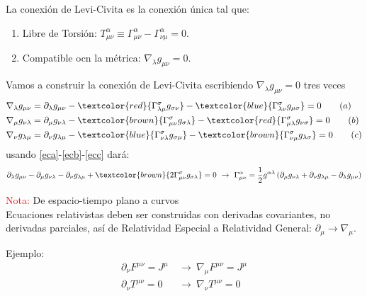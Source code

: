 \documentclass[../main]{subfiles}
\begin{document}
\begin{adjustwidth}{0pt}{-100pt}
 La conexión de Levi-Civita es la conexión única tal que:
\begin{enumerate}
    \item Libre de Torsión: $T^{\alpha}_{\mu\nu}\equiv \Gamma^{\alpha}_{\mu\nu}-\Gamma^{\alpha}_{\nu\mu}=0$.
    \item Compatible ocn la métrica: $\nabla_{\lambda} g_{\mu\nu}=0$.
\end{enumerate}

Vamos a construir la conexión de Levi-Civita escribiendo $\nabla_{\lambda}g_{\mu\nu}=0$ tres veces 
\begin{align}
    \nabla_{\lambda}g_{\mu\nu}&=\partial_{\lambda}g_{\mu\nu}-\textcolor{red}{\Gamma^{\sigma}_{\lambda\mu}g_{\sigma\nu}}-\textcolor{blue}{\Gamma^{\sigma}_{\lambda\nu}g_{\mu\sigma}}=0 \tag{$a$} \label{eca}\\
    \nabla_{\mu}g_{\nu\lambda}&=\partial_{\mu}g_{\nu\lambda}-\textcolor{brown}{\Gamma^{\sigma}_{\mu\nu}g_{\sigma\lambda}}-\textcolor{red}{\Gamma^{\sigma}_{\mu\lambda}g_{\nu\sigma}}=0 \tag{$b$} \label{ecb}\\
    \nabla_{\nu}g_{\lambda\mu}&=\partial_{\nu}g_{\lambda\mu}-\textcolor{blue}{\Gamma^{\sigma}_{\nu\lambda}g_{\sigma\mu}}-\textcolor{brown}{\Gamma^{\sigma}_{\nu\mu}g_{\lambda\sigma}}=0 \tag{$c$} \label{ecc}
\end{align}
usando \eqref{eca}-\eqref{ecb}-\eqref{ecc} dará: 
\begin{equation}
    \partial_{\lambda}g_{\mu\nu}-\partial_{\mu}g_{\nu\lambda}-\partial_{\nu}g_{\lambda\mu}+\textcolor{brown}{2\Gamma^{\sigma}_{\mu\nu}g_{\sigma\lambda}}=0 \ \rightarrow \ \Gamma^{\alpha}_{\mu\nu}=\dfrac{1}{2}g^{\alpha\lambda}\left(\partial_{\mu} g_{\nu\lambda}+\partial_{\nu} g_{\lambda\mu}-\partial_{\lambda}g_{\mu\nu}\right) 
\end{equation}

\textcolor{red}{Nota:} De espacio-tiempo plano a curvos\\

Ecuaciones relativistas deben ser construidas con derivadas covariantes, no derivadas parciales, así de Relatividad Especial a Relatividad General: $\partial_{\mu} \rightarrow \nabla_{\mu}$.

Ejemplo:
\begin{equation}
    \begin{aligned}
        \partial_{\nu} F^{\mu\nu}=J^{\mu} \ &\rightarrow \ \nabla_{\mu}F^{\mu\nu}=J^{\mu}\\
        \partial_{\nu} T^{\mu\nu}=0 \ &\rightarrow \ \nabla_{\nu} T^{\mu\nu}=0
    \end{aligned}
\end{equation}


\end{adjustwidth}
\end{document}
